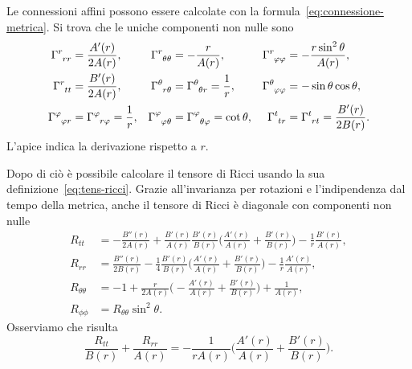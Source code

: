 Le connessioni affini possono essere calcolate con la
formula~\eqref{eq:connessione-metrica}.  Si trova che le uniche componenti non
nulle sono
\begin{subequations}
  \begin{align}
    \tensor{\Gamma}{^{r}_{rr}} &= \frac{A'(r)}{2A(r)}, &
    \tensor{\Gamma}{^{r}_{\theta\theta}} &= -\frac{r}{A(r)}, &
    \tensor{\Gamma}{^{r}_{\phi\phi}} &= -\frac{r \sin^{2}\theta}{A(r)}, \\
    \tensor{\Gamma}{^{r}_{tt}} &= \frac{B'(r)}{2A(r)}, &
    \tensor{\Gamma}{^{\theta}_{r\theta}} &=
    \tensor{\Gamma}{^{\theta}_{\theta r}} = \frac{1}{r}, &
    \tensor{\Gamma}{^{\theta}_{\phi\phi}} &= -\sin\theta \cos\theta, \\
    \tensor{\Gamma}{^{\phi}_{\phi r}} &= \tensor{\Gamma}{^{\phi}_{r\phi}} =
    \frac{1}{r}, & \tensor{\Gamma}{^{\phi}_{\phi\theta}} &=
    \tensor{\Gamma}{^{\phi}_{\theta\phi}} = \cot\theta, &
    \tensor{\Gamma}{^{t}_{tr}} &= \tensor{\Gamma}{^{t}_{rt}} =
    \frac{B'(r)}{2B(r)}.
  \end{align}
\end{subequations}
L'apice indica la derivazione rispetto a $r$.

Dopo di ciò è possibile calcolare il tensore di Ricci usando la sua
definizione~\eqref{eq:tens-ricci}.  Grazie all'invarianza per rotazioni e
l'indipendenza dal tempo della metrica, anche il tensore di Ricci è diagonale
con componenti non nulle
\begin{subequations}
  \label{eq:ricci-sferico}
  \begin{align}
    R_{tt} &= -\frac{B''(r)}{2A(r)} +
    \frac{B'(r)}{A(r)}\frac{B'(r)}{B(r)}\bigg(\frac{A'(r)}{A(r)} +
    \frac{B'(r)}{B(r)}\bigg) -
    \frac{1}{r}\frac{B'(r)}{A(r)}, \\
    R_{rr} &= \frac{B''(r)}{2B(r)} - \frac{1}{4}
    \frac{B'(r)}{B(r)}\bigg(\frac{A'(r)}{A(r)} + \frac{B'(r)}{B(r)}\bigg) -
    \frac{1}{r}\frac{A'(r)}{A(r)}, \\
    R_{\theta\theta} &= -1 + \frac{r}{2A(r)}\bigg(-\frac{A'(r)}{A(r)} +
    \frac{B'(r)}{B(r)}\bigg) + \frac{1}{A(r)}, \\
    R_{\phi\phi} &= R_{\theta\theta} \sin^{2}\theta.
  \end{align}
\end{subequations}
Osserviamo che risulta
\begin{equation}
  \label{eq:bar}
  \frac{R_{tt}}{B(r)} + \frac{R_{rr}}{A(r)} =
  -\frac{1}{rA(r)}\bigg(\frac{A'(r)}{A(r)} + \frac{B'(r)}{B(r)}\bigg).
\end{equation}

